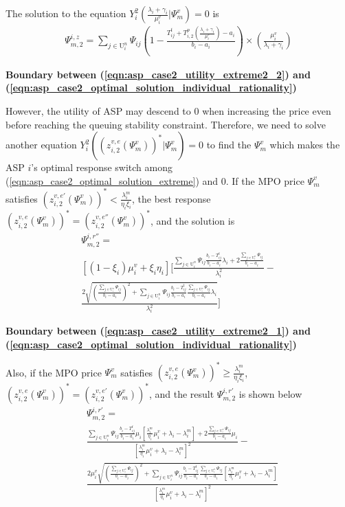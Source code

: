 \documentclass[10pt,journal, compsoc]{IEEEtran}
\begin{document}
The solution to the equation $Y_i^2(\frac{\lambda_i+\gamma_i}{\mu_i^v}|\Psi_m^v) = 0$ is
\begin{equation}
\begin{aligned}
\Psi_{m,2}^{i,z}= 
\sum_{j \in \mathrm{U}_i^{n}}\Psi_{ij}(1-\frac{T_{ij}^t + T_{i,2}^p(\frac{\lambda_i+\gamma_i}{\mu_i^v})-a_i}{b_i-a_i})\times(\frac{\mu_i^v}{\lambda_i+\gamma_i})
\end{aligned}
\end{equation}

\textbf{Boundary between (\ref{eqn:asp_case2_utility_extreme2_2}) and (\ref{eqn:asp_case2_optimal_solution_individual_rationality})}

However, the utility of ASP may descend to $0$ when increasing the price even before reaching the queuing stability constraint. Therefore, we need to solve another equation $Y_i^2((z_{i,2}^{v,e}(\Psi_m^v))^*|\Psi_m^v) = 0$ to find the $\Psi_m^v$ which makes the ASP $i$'s optimal response switch among (\ref{eqn:asp_case2_optimal_solution_extreme}) and $0$.
If the MPO price $\Psi_m^v$ satisfies $(z_{i,2}^{v,e'}(\Psi_m^v))^* < \frac{\lambda_i^m}{\eta_i\xi_i}$, the best response $(z_{i,2}^{v,e}(\Psi_m^v))^* = (z_{i,2}^{v,e''}(\Psi_m^v))^*$, and the solution is
\begin{multline}
\Psi_{m,2}^{i,r''} =\\ [(1-\xi_i)\mu_i^v + \xi_i \eta_i]\big[\frac{\sum_{j \in \mathrm{U}_i^n}\Psi_{ij}\frac{b_i-T_{ij}^t }{b_i-a_i}\lambda_i+2\frac{\sum_{j \in \mathrm{U}_i^n}\Psi_{ij}}{b_i-a_i}}{\lambda_i^2}-\\
\frac{2\sqrt{(\frac{\sum_{j \in \mathrm{U}_i^n}\Psi_{ij}}{b_i-a_i})^2+\sum_{j \in \mathrm{U}_i^n}\Psi_{ij}\frac{b_i-T_{ij}^t}{b_i-a_i}\frac{\sum_{j \in \mathrm{U}_i^n}\Psi_{ij}}{b_i-a_i}\lambda_i}}{\lambda_i^2}\big]
\end{multline}

\textbf{Boundary between (\ref{eqn:asp_case2_utility_extreme2_1}) and (\ref{eqn:asp_case2_optimal_solution_individual_rationality})}

Also, if the MPO price $\Psi_m^v$ satisfies $(z_{i,2}^{v,e}(\Psi_m^v))^* \geq \frac{\lambda_i^m}{\eta_i\xi_i}$, $(z_{i,2}^{v,e}(\Psi_m^v))^* = (z_{i,2}^{v,e'}(\Psi_m^v))^*$, and the result $\Psi_{m,2}^{i,r'}$ is shown below
\begin{equation}
    \begin{aligned}
    &\Psi_{m,2}^{i,r'} =\\ & \frac{\sum\limits_{j \in \mathrm{U}_i^n}\Psi_{ij}\frac{b_i-T_{ij}^t }{b_i-a_i}\mu_i[\frac{\lambda_i^m}{\eta_i}\mu_i^v+\lambda_i-\lambda_i^m]+2\frac{\sum_{j \in \mathrm{U}_i^n}\Psi_{ij}}{b_i-a_i}\mu_i}{[\frac{\lambda_i^m}{\eta_i}\mu_i^v+\lambda_i-\lambda_i^m]^2}- \\
&\frac{2\mu_i^v\sqrt{(\frac{\sum\limits_{j \in \mathrm{U}_i^n}\Psi_{ij}}{b_i-a_i})^2+\sum\limits_{j \in \mathrm{U}_i^n}\Psi_{ij}\frac{b_i-T_{ij}^t}{b_i-a_i}\frac{\sum\limits_{j \in \mathrm{U}_i^n}\Psi_{ij}}{b_i-a_i}[\frac{\lambda^m_i}{\eta_i}\mu_i^v+\lambda_i-\lambda_i^m]}}{[\frac{\lambda_i^m}{\eta_i}\mu_i^v+\lambda_i-\lambda_i^m]^2}
\end{aligned}
\end{equation}
\end{document}

